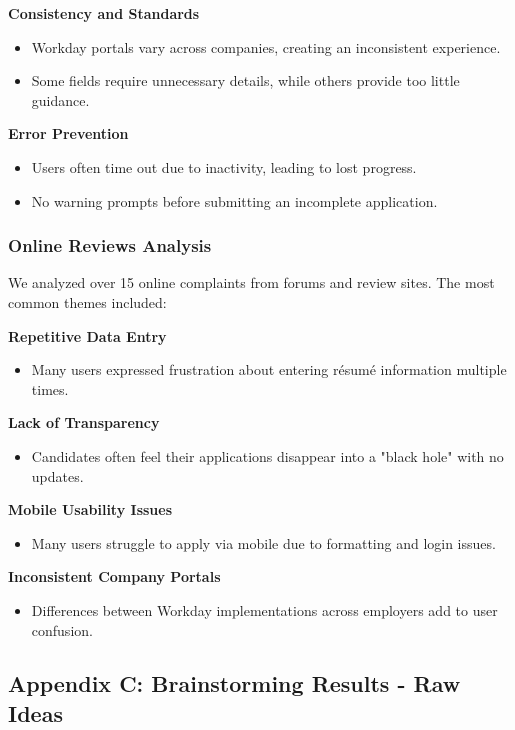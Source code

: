 \documentclass[
	letterpaper, %
]{jdf}
\begin{document}
\begin{sloppypar}
\textbf{Consistency and Standards}  
\begin{itemize}  
    \item Workday portals vary across companies, creating an inconsistent experience.  
    \item Some fields require unnecessary details, while others provide too little guidance.  
\end{itemize}  

\textbf{Error Prevention}  
\begin{itemize}  
    \item Users often time out due to inactivity, leading to lost progress.  
    \item No warning prompts before submitting an incomplete application.  
\end{itemize}   

\subsubsection*{Online Reviews Analysis}  

We analyzed over 15 online complaints from forums and review sites. The most common themes included:  

\textbf{Repetitive Data Entry}  
\begin{itemize}  
    \item Many users expressed frustration about entering résumé information multiple times.  
\end{itemize}   

\textbf{Lack of Transparency}  
\begin{itemize}  
    \item Candidates often feel their applications disappear into a "black hole" with no updates.  
\end{itemize}   

\textbf{Mobile Usability Issues}  
\begin{itemize}  
    \item Many users struggle to apply via mobile due to formatting and login issues.  
\end{itemize}  

\textbf{Inconsistent Company Portals}  
\begin{itemize}  
    \item Differences between Workday implementations across employers add to user confusion.  
\end{itemize}  


\subsection{Appendix C: Brainstorming Results - Raw Ideas}


\end{sloppypar}
\end{document}
